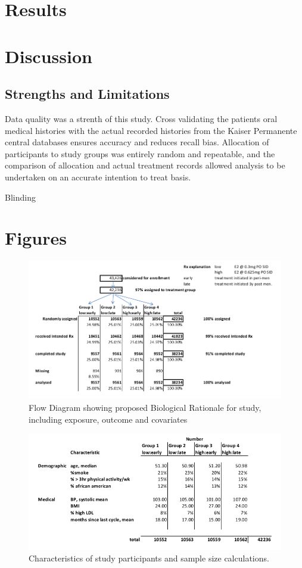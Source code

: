 \documentclass[12pt]{article}
\begin{document}
	\section{Results}


	\section{Discussion} 


	\subsection{Strengths and Limitations}
		Data quality was a strenth of this study.
		Cross validating the patients oral medical histories with the actual recorded histories from the Kaiser Permanente central databases ensures accuracy and reduces recall bias.
		Allocation of participants to study groups was entirely random and repeatable, and the comparison of allocation and actual treatment records allowed analysis to be undertaken on an accurate intention to treat basis. 

		Blinding 
		
	\section{Figures}

\begin{figure}[h!]
	\centering
	\includegraphics[scale=0.3]{figure1.jpg}
	\caption{Flow Diagram showing proposed Biological Rationale for study, including exposure, outcome and covariates }
	\label{figure1}
\end{figure}

\begin{figure}[h!]
	\centering
	\includegraphics[scale=0.5]{table1.jpg}
	\caption{Characteristics of study participants and sample size calculations.}
	\label{table1}
\end{figure}
 
\end{document}

